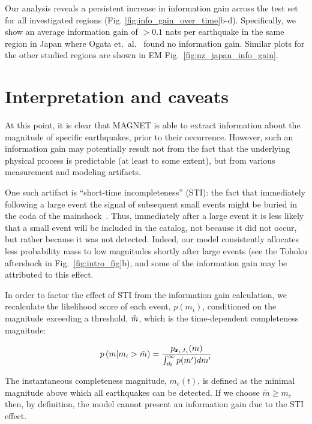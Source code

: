 \documentclass[pdflatex]{sn-jnl}
\begin{document}
Our analysis reveals a persistent increase in information gain across the test set for all investigated regions (Fig. \ref{fig:info_gain_over_time}b-d). Specifically, we show an average information gain of $>0.1$ nats per earthquake in the same region in Japan where Ogata et.~al.~\cite{ogata_exploring_2018} found no information gain. Similar plots for the other studied regions are shown in EM Fig.~\ref{fig:nz_japan_info_gain}.

\section{Interpretation and caveats}
At this point, it is clear that MAGNET is able to extract information about the magnitude of specific earthquakes, prior to their occurrence. However, such an information gain may potentially result not from the fact that the underlying physical process is predictable (at least to some extent), but from various measurement and modeling artifacts. 

One such artifact is ``short-time incompleteness'' (STI): the fact that immediately following a large event the signal of subsequent small events might be buried in the coda of the mainshock~\cite{kagan_short-term_2004, stockman_forecasting_2023}. Thus, immediately after a large event it is less likely that a small event will be included in the catalog, not because it did not occur, but rather because it was not detected. Indeed, our model consistently allocates less probability mass to low magnitudes shortly after large events (see the Tohoku aftershock in Fig.~\ref{fig:intro_fig}b), and some of the information gain may be attributed to this effect.  

In order to factor the effect of STI from the information gain calculation, we recalculate the likelihood score of each event, $p(m_i)$, conditioned on the magnitude exceeding a threshold, $\Tilde{m}$, which is the time-dependent completeness magnitude:

\begin{equation}
    p \left( m \vert m_i > \Tilde{m} \right) = \frac{p_{\pmb{x}_i, t_i}(m)} {\int_{\Tilde{m}}^{\infty} p(m') dm'}
    \label{eq:conditioned_likelihood}
\end{equation}

The instantaneous completeness magnitude, $m_c(t)$, is defined as the minimal magnitude above which all earthquakes can be detected. If we choose $\tilde m \geq m_c$ then, by definition, the model cannot present an information gain due to the STI effect.
\end{document}
